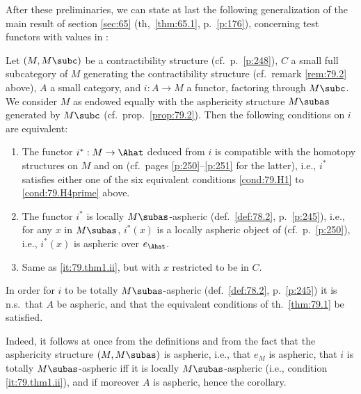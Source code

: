 After these preliminaries, we can state at last the following
generalization of the main result of section \ref{sec:65} (th,\
\ref{thm:65.1}, p.\ \ref{p:176}), concerning test functors with values
in \Cat:
\begin{theoremnum}\label{thm:79.1}
  Let $(M,M\subc)$ be a contractibility structure \textup(cf.\ p.\
  \ref{p:248}\textup), $C$ a small full subcategory of $M$ generating
  the contractibility structure \textup(cf.\ remark \ref{rem:79.2}
  above\textup), $A$ a small category, and $i:A\to M$ a functor,
  factoring through $M\subc$. We consider $M$ as endowed equally with
  the asphericity structure $M\subas$ generated by $M\subc$
  \textup(cf.\ prop.\ \ref{prop:79.2}\textup). Then the following
  conditions on $i$ are equivalent:
  \begin{enumerate}[label=(\roman*),font=\normalfont]
  \item\label{it:79.thm1.i}
    The functor $i^*:M\to\Ahat$ deduced from $i$ is compatible with
    the homotopy structures on $M$ and on \Ahat{} \textup(cf.\ pages
    \ref{p:250}--\ref{p:251} for the latter\textup), i.e., $i^*$
    satisfies either one of the six equivalent conditions
    \textup{\ref{cond:79.H1}} to \textup{\ref{cond:79.H4prime}} above.
  \item\label{it:79.thm1.ii}
    The functor $i^*$ is locally $M\subas$-aspheric \textup(def.\
    \ref{def:78.2}, p.\ \ref{p:245}\textup), i.e., for any $x$ in
    $M\subas$, $i^*(x)$ is a locally aspheric object of \Ahat{}
    \textup(cf.\ p.\ \ref{p:250}\textup), i.e., $i^*(x)$ is aspheric
    over $e_\Ahat$.
  \item\label{it:79.thm1.iii}
    Same as \textup{\ref{it:79.thm1.ii}}, but with $x$ restricted to
    be in $C$.
  \end{enumerate}
\end{theoremnum}
\begin{corollarynum}\label{cor:79.1}
  In order for $i$ to be totally $M\subas$-aspheric \textup(def.\
  \ref{def:78.2}, p.\ \ref{p:245}\textup) it is n.s.\ that
  $A$ be aspheric, and that the equivalent conditions of th.\
  \ref{thm:79.1} be satisfied.
\end{corollarynum}

Indeed, it follows at once from the definitions and from the fact that
the asphericity structure $(M,M\subas)$ is aspheric, i.e., that $e_M$
is aspheric, that $i$ is totally $M\subas$-aspheric if{f} it is
locally $M\subas$-aspheric (i.e., condition \ref{it:79.thm1.ii}), and
if moreover $A$ is aspheric, hence the corollary.

